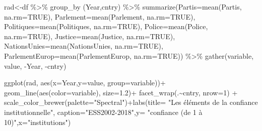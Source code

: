 \documentclass[
]{book}
\newenvironment{Shaded}{\begin{snugshade}}{\end{snugshade}}
\newcommand{\AttributeTok}[1]{\textcolor[rgb]{0.77,0.63,0.00}{#1}}
\newcommand{\ConstantTok}[1]{\textcolor[rgb]{0.00,0.00,0.00}{#1}}
\newcommand{\DecValTok}[1]{\textcolor[rgb]{0.00,0.00,0.81}{#1}}
\newcommand{\FloatTok}[1]{\textcolor[rgb]{0.00,0.00,0.81}{#1}}
\newcommand{\FunctionTok}[1]{\textcolor[rgb]{0.00,0.00,0.00}{#1}}
\newcommand{\NormalTok}[1]{#1}
\newcommand{\OtherTok}[1]{\textcolor[rgb]{0.56,0.35,0.01}{#1}}
\newcommand{\SpecialCharTok}[1]{\textcolor[rgb]{0.00,0.00,0.00}{#1}}
\newcommand{\StringTok}[1]{\textcolor[rgb]{0.31,0.60,0.02}{#1}}
\begin{document}
\begin{Shaded}
\begin{Highlighting}[]
\NormalTok{rad}\OtherTok{\textless{}{-}}\NormalTok{df }\SpecialCharTok{\%\textgreater{}\%} 
  \FunctionTok{group\_by}\NormalTok{ (Year,cntry) }\SpecialCharTok{\%\textgreater{}\%} 
  \FunctionTok{summarize}\NormalTok{(}\AttributeTok{Partis=}\FunctionTok{mean}\NormalTok{(Partis, }\AttributeTok{na.rm=}\ConstantTok{TRUE}\NormalTok{),}
  \AttributeTok{Parlement=}\FunctionTok{mean}\NormalTok{(Parlement, }\AttributeTok{na.rm=}\ConstantTok{TRUE}\NormalTok{),}
  \AttributeTok{Politiques=}\FunctionTok{mean}\NormalTok{(Politiques, }\AttributeTok{na.rm=}\ConstantTok{TRUE}\NormalTok{),}
  \AttributeTok{Police=}\FunctionTok{mean}\NormalTok{(Police, }\AttributeTok{na.rm=}\ConstantTok{TRUE}\NormalTok{),}
  \AttributeTok{Justice=}\FunctionTok{mean}\NormalTok{(Justice, }\AttributeTok{na.rm=}\ConstantTok{TRUE}\NormalTok{),}
  \AttributeTok{NationsUnies=}\FunctionTok{mean}\NormalTok{(NationsUnies, }\AttributeTok{na.rm=}\ConstantTok{TRUE}\NormalTok{),}
  \AttributeTok{ParlementEurop=}\FunctionTok{mean}\NormalTok{(ParlementEurop, }\AttributeTok{na.rm=}\ConstantTok{TRUE}\NormalTok{)) }\SpecialCharTok{\%\textgreater{}\%} 
  \FunctionTok{gather}\NormalTok{(variable, value, }\SpecialCharTok{{-}}\NormalTok{Year, }\SpecialCharTok{{-}}\NormalTok{cntry)}

\FunctionTok{ggplot}\NormalTok{(rad, }\FunctionTok{aes}\NormalTok{(}\AttributeTok{x=}\NormalTok{Year,}\AttributeTok{y=}\NormalTok{value, }\AttributeTok{group=}\NormalTok{variable))}\SpecialCharTok{+}
  \FunctionTok{geom\_line}\NormalTok{(}\FunctionTok{aes}\NormalTok{(}\AttributeTok{color=}\NormalTok{variable), }\AttributeTok{size=}\FloatTok{1.2}\NormalTok{)}\SpecialCharTok{+}
  \FunctionTok{facet\_wrap}\NormalTok{(.}\SpecialCharTok{\textasciitilde{}}\NormalTok{cntry, }\AttributeTok{nrow=}\DecValTok{1}\NormalTok{) }\SpecialCharTok{+}
  \FunctionTok{scale\_color\_brewer}\NormalTok{(}\AttributeTok{palette=}\StringTok{"Spectral"}\NormalTok{)}\SpecialCharTok{+}\FunctionTok{labs}\NormalTok{(}\AttributeTok{title=} \StringTok{"Les éléments de la confiance institutionnelle"}\NormalTok{, }\AttributeTok{caption=}\StringTok{"ESS2002{-}2018"}\NormalTok{,}\AttributeTok{y=} \StringTok{"confiance (de 1 à 10)"}\NormalTok{,}\AttributeTok{x=}\StringTok{"institutions"}\NormalTok{) }
\end{Highlighting}
\end{Shaded}
\end{document}
